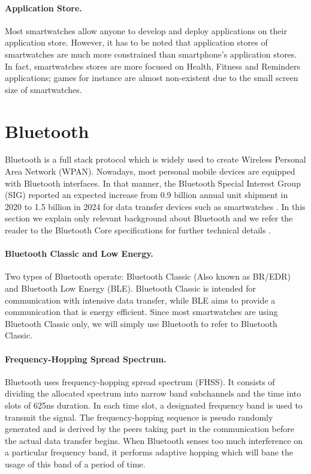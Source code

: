 \paragraph{Application Store.} Most smartwatches allow anyone to develop and deploy applications on their application store. However, it has to be noted that application stores of smartwatches are much more constrained than smartphone's application stores. In fact, smartwatches stores are more focused on Health, Fitness and Reminders applications; games for instance are almost non-existent due to the small screen size of smartwatches. 


\section{Bluetooth}
\label{sec:Bluetooth}
Bluetooth is a full stack protocol which is widely used to create Wireless Personal Area Network (WPAN). Nowadays, most personal mobile devices are equipped with Bluetooth interfaces. In that manner, the Bluetooth Special Interest Group (SIG) reported an expected increase from 0.9 billion annual unit shipment in 2020 to 1.5 billion in 2024 for data transfer devices such as smartwatches \cite{bluetoothMarket}. In this section we explain only relevant background about Bluetooth and we refer the reader to the Bluetooth Core specifications for further technical details \cite{bluetoothSpecs}.



\paragraph{Bluetooth Classic and Low Energy.} Two types of Bluetooth operate: Bluetooth Classic (Also known as BR/EDR) and Bluetooth Low Energy (BLE). Bluetooth Classic is intended for communication with intensive data transfer, while BLE aims to provide a communication that is energy efficient. Since most smartwatches are using Bluetooth Classic only, we will simply use Bluetooth to refer to Bluetooth Classic. 


\paragraph{Frequency-Hopping Spread Spectrum.} Bluetooth uses frequency-hopping spread spectrum (FHSS). It consists of dividing the allocated spectrum into narrow band subchannels and the time into slots of 625ns duration. In each time slot, a designated frequency band is used to transmit the signal. The frequency-hopping sequence is pseudo randomly generated and is derived by the peers taking part in the communication before the actual data transfer begins. When Bluetooth senses too much interference on a particular frequency band, it performs adaptive hopping which will bane the usage of this band of a period of time.  



